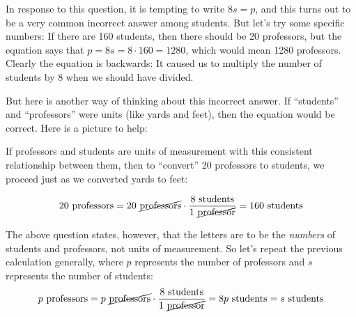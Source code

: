 \documentclass[nooutcomes]{ximera}
\begin{document}
In response to this question, it is tempting to write $8s = p$, and this turns out to be a very common incorrect answer among students.  But let's try some specific numbers:  If there are 160 students, then there should be 20 professors, but the equation says that $p = 8s = 8\cdot 160 = 1280$, which would mean 1280 professors.  Clearly the equation is backwards: It caused us to multiply the number of students by 8 when we should have divided.  

But here is another way of thinking about this incorrect answer.  If ``students'' and ``professors'' were units (like yards and feet), then the equation would be correct. Here is a picture to help:  

\begin{image}
\end{image}

If professors and students are units of measurement with this consistent relationship between them, then to ``convert''  20 professors to students, we proceed just as we converted yards to feet:  

\[
20\textrm{ professors} = 20\textrm{ \cancel{professors}} \cdot \frac{{8 \textrm{ students}}}{1\textrm{ \cancel{professor}}} = 
 160\textrm{ students}
\]

The above question states, however, that the letters are to be the \emph{numbers} of students and professors, not units of measurement.  So let's repeat the previous calculation generally, where $p$ represents the number of professors and $s$ represents the number of students:  
\[
p\textrm{ professors} = p\textrm{ \cancel{professors}} \cdot \frac{{8 \textrm{ students}}}{1\textrm{ \cancel{professor}}} = 
 8p\textrm{ students} = s \textrm{ students}
\]
\end{document}
